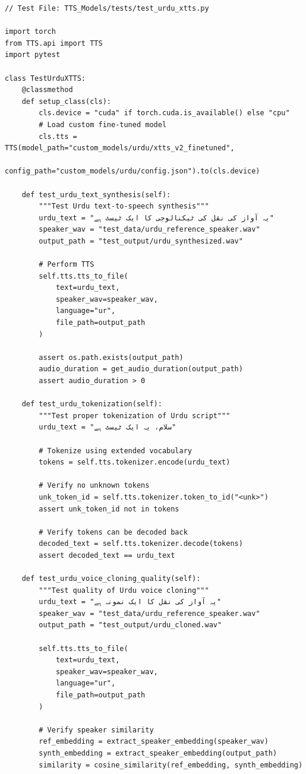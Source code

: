 \begin{verbatim}
// Test File: TTS_Models/tests/test_urdu_xtts.py

import torch
from TTS.api import TTS
import pytest

class TestUrduXTTS:
    @classmethod
    def setup_class(cls):
        cls.device = "cuda" if torch.cuda.is_available() else "cpu"
        # Load custom fine-tuned model
        cls.tts = TTS(model_path="custom_models/urdu/xtts_v2_finetuned",
                      config_path="custom_models/urdu/config.json").to(cls.device)
    
    def test_urdu_text_synthesis(self):
        """Test Urdu text-to-speech synthesis"""
        urdu_text = "یہ آواز کی نقل کی ٹیکنالوجی کا ایک ٹیسٹ ہے"
        speaker_wav = "test_data/urdu_reference_speaker.wav"
        output_path = "test_output/urdu_synthesized.wav"
        
        # Perform TTS
        self.tts.tts_to_file(
            text=urdu_text,
            speaker_wav=speaker_wav,
            language="ur",
            file_path=output_path
        )
        
        assert os.path.exists(output_path)
        audio_duration = get_audio_duration(output_path)
        assert audio_duration > 0
    
    def test_urdu_tokenization(self):
        """Test proper tokenization of Urdu script"""
        urdu_text = "سلام، یہ ایک ٹیسٹ ہے"
        
        # Tokenize using extended vocabulary
        tokens = self.tts.tokenizer.encode(urdu_text)
        
        # Verify no unknown tokens
        unk_token_id = self.tts.tokenizer.token_to_id("<unk>")
        assert unk_token_id not in tokens
        
        # Verify tokens can be decoded back
        decoded_text = self.tts.tokenizer.decode(tokens)
        assert decoded_text == urdu_text
    
    def test_urdu_voice_cloning_quality(self):
        """Test quality of Urdu voice cloning"""
        urdu_text = "یہ آواز کی نقل کا ایک نمونہ ہے"
        speaker_wav = "test_data/urdu_reference_speaker.wav"
        output_path = "test_output/urdu_cloned.wav"
        
        self.tts.tts_to_file(
            text=urdu_text,
            speaker_wav=speaker_wav,
            language="ur",
            file_path=output_path
        )
        
        # Verify speaker similarity
        ref_embedding = extract_speaker_embedding(speaker_wav)
        synth_embedding = extract_speaker_embedding(output_path)
        similarity = cosine_similarity(ref_embedding, synth_embedding)
        

\end{verbatim}

